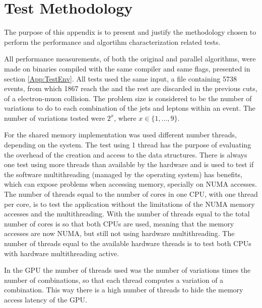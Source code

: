 \appendix
{}
\chapter{Test Methodology}
\label{App:TestMethodology}

The purpose of this appendix is to present and justify the methodology chosen to perform the performance and algortihm characterization related tests.

All performance measurements, of both the original and parallel algorithms, were made on binaries compiled with the same compiler and same flags, presented in section \ref{App:TestEnv}. All tests used the same input, a file containing 5738 events, from which 1867 reach the \ttDilepKinFit and the rest are discarded in the previous cuts, of a electron-muon collision. The problem size is considered to be the number of variations to do to each combination of the jets and leptons within an event. The number of variations tested were $2^{x}$, where $x \in \{1, ..., 9\}$.

For the shared memory implementation was used different number threads, depending on the system. The test using 1 thread has the purpose of evaluating the overhead of the creation and access to the data structures. There is always one test using more threads than available by the hardware and is used to test if the software multithreading (managed by the operating system) has benefits, which can expose problems when accessing memory, specially on NUMA accesses. The number of threads equal to the number of cores in one CPU, with one thread per core, is to test the application without the limitations of the NUMA memory accesses and the multithreading. With the number of threads equal to the total number of cores is so that both CPUs are used, meaning that the memory accesses are now NUMA, but still not using hardware multithreading. The number of threads equal to the available hardware threads is to test both CPUs with hardware multithreading active.

In the GPU the number of threads used was the number of variations times the number of combinations, so that each thread computes a variation of a combination. This way there is a high number of threads to hide the memory access latency of the GPU.


